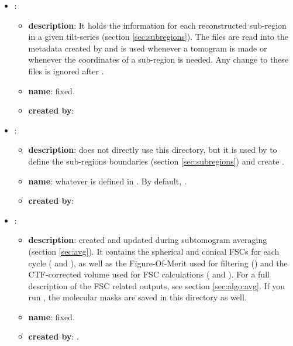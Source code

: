 \begin{itemize}
    \item {}:
     \begin{itemize}
        \item \textbf{description}: It holds the information for each reconstructed sub-region in a given tilt-series (section \ref{sec:subregions}). The  files are read into the metadata created by  and is used whenever a tomogram is made or whenever the coordinates of a sub-region is needed. Any change to these files is ignored after .
        \item \textbf{name}: fixed.
        \item \textbf{created by}: 
    \end{itemize}

    \item {}:
     \begin{itemize}
        \item \textbf{description}: {\emClarity} does not directly use this directory, but it is used by  to define the sub-regions boundaries (section \ref{sec:subregions}) and create .
        \item \textbf{name}: whatever is defined in . By default, .
        \item \textbf{created by}: 
    \end{itemize}

    \item {}:
     \begin{itemize}
        \item \textbf{description}: created and updated during subtomogram averaging (section \ref{sec:avg}). It contains the spherical and conical FSCs for each cycle ( and ), as well as the Figure-Of-Merit used for filtering () and the CTF-corrected volume used for FSC calculations ( and ). For a full description of the FSC related outputs, see section \ref{sec:algo:avg}. If you run , the molecular masks are saved in this directory as well.
        \item \textbf{name}: fixed.
        \item \textbf{created by}: {\emClarity} .
    \end{itemize}
    

\end{itemize}
